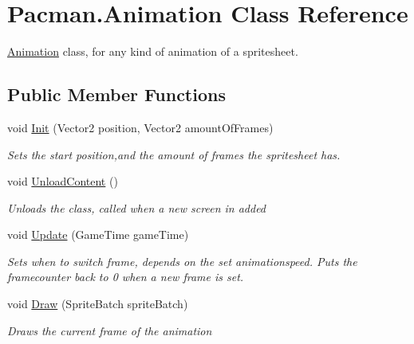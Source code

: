 \hypertarget{class_pacman_1_1_animation}{\section{Pacman.\-Animation Class Reference}
\label{class_pacman_1_1_animation}
}


\hyperlink{class_pacman_1_1_animation}{Animation} class, for any kind of animation of a spritesheet.  


\subsection*{Public Member Functions}
\begin{DoxyCompactItemize}
\item 
void \hyperlink{class_pacman_1_1_animation_a647ddbbc60c46ba27cf6fe424e576fe3}{Init} (Vector2 position, Vector2 amount\-Of\-Frames)
\begin{DoxyCompactList}\small\item\em Sets the start position,and the amount of frames the spritesheet has. \end{DoxyCompactList}\item 
void \hyperlink{class_pacman_1_1_animation_ab665843c3b44bdc41148856c73626b0b}{Unload\-Content} ()
\begin{DoxyCompactList}\small\item\em Unloads the class, called when a new screen in added \end{DoxyCompactList}\item 
void \hyperlink{class_pacman_1_1_animation_a610e195f160dcb4bf850debc61b1454d}{Update} (Game\-Time game\-Time)
\begin{DoxyCompactList}\small\item\em Sets when to switch frame, depends on the set animationspeed. Puts the framecounter back to 0 when a new frame is set. \end{DoxyCompactList}\item 
void \hyperlink{class_pacman_1_1_animation_abcf15386a6a54dc98bc07ec5a82d96ad}{Draw} (Sprite\-Batch sprite\-Batch)
\begin{DoxyCompactList}\small\item\em Draws the current frame of the animation \end{DoxyCompactList}\end{DoxyCompactItemize}
